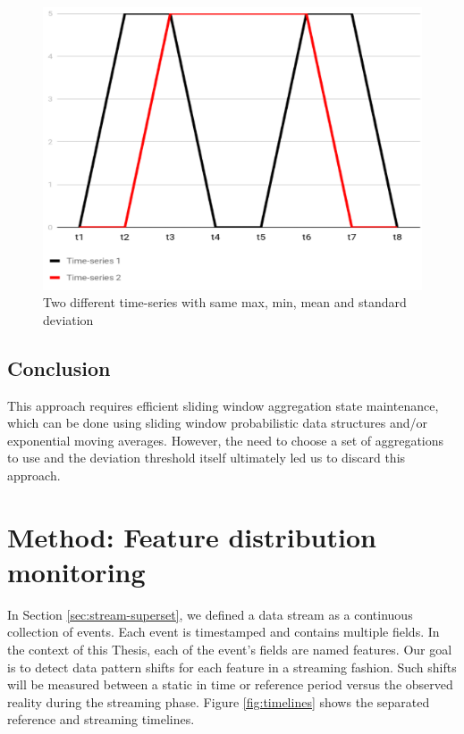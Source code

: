 \begin{figure}[!htb]
    \begin{center}
      \includegraphics[scale=0.7]{figures/approach2-timeseries.png}
      \caption[]{Two different time-series with same max, min, mean and standard deviation}
      \label{fig:approach2-timeseries}
    \end{center}
\end{figure}

\subsection*{Conclusion}
This approach requires efficient sliding window aggregation state maintenance, which can be done using sliding window probabilistic data structures and/or exponential moving averages. However, the need to choose a set of aggregations to use and the deviation threshold itself ultimately led us to discard this approach.

\section{Method: Feature distribution monitoring} \label{sec:ft-monitoring}

In Section \ref{sec:stream-superset}, we defined a data stream as a continuous collection of events. Each event is timestamped and contains multiple fields. In the context of this Thesis, each of the event's fields are named features. Our goal is to detect data pattern shifts for each feature in a streaming fashion. Such shifts will be measured between a static in time or reference period versus the observed reality during the streaming phase. Figure \ref{fig:timelines} shows the separated reference and streaming timelines.

